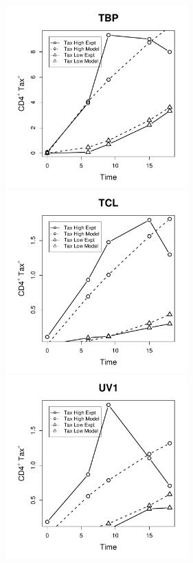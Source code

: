 \begin{figure}[htp]
\flushleft
\includegraphics[width=7cm]{./Figures/chapter5/figure_timecourse_tbp}%
\hspace{0cm}%
\includegraphics[width=7cm]{./Figures/chapter5/figure_timecourse_tcl} \\
\includegraphics[width=7cm]{./Figures/chapter5/figure_timecourse_uv1}%
\end{figure}


